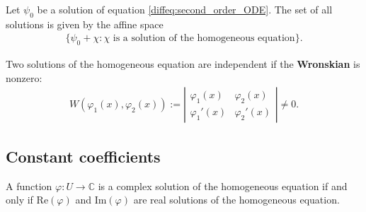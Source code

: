     \begin{property}
        Let $\psi_0$ be a solution of equation \ref{diffeq:second_order_ODE}. The set of all solutions is given by the affine space
        \begin{gather}
            \big\{\psi_0 + \chi:\chi\text{ is a solution of the homogeneous equation}\big\}.
        \end{gather}
    \end{property}
    \begin{property}
        Two solutions of the homogeneous equation are independent if the \textbf{Wronskian} is nonzero:
        \begin{gather}
            \label{diffeq:wronskian}
            W\left(\varphi_1(x), \varphi_2(x)\right) := \left|
            \begin{array}{cc}
                \varphi_1(x)&\varphi_2(x)\\
                \varphi_1'(x)&\varphi_2'(x)
            \end{array}
            \right|\neq 0.
        \end{gather}
    \end{property}


\subsection{Constant coefficients}

    \begin{property}
        A function $\varphi:U\rightarrow \mathbb{C}$ is a complex solution of the homogeneous equation if and only if $\text{Re}(\varphi)$ and $\text{Im}(\varphi)$ are real solutions of the homogeneous equation.
    \end{property}

